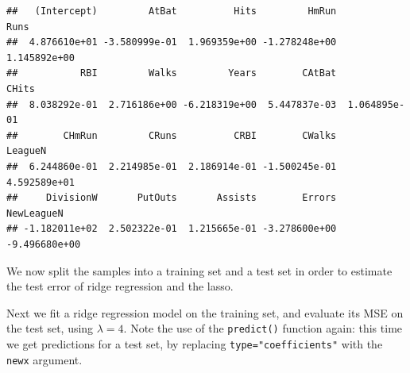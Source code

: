 \documentclass[
  openany]{book}
\newenvironment{Shaded}{\begin{snugshade}}{\end{snugshade}}
\newcommand{\DecValTok}[1]{\textcolor[rgb]{0.00,0.00,0.81}{#1}}
\newcommand{\FloatTok}[1]{\textcolor[rgb]{0.00,0.00,0.81}{#1}}
\newcommand{\KeywordTok}[1]{\textcolor[rgb]{0.13,0.29,0.53}{\textbf{#1}}}
\newcommand{\NormalTok}[1]{#1}
\newcommand{\OperatorTok}[1]{\textcolor[rgb]{0.81,0.36,0.00}{\textbf{#1}}}
\newcommand{\StringTok}[1]{\textcolor[rgb]{0.31,0.60,0.02}{#1}}
\begin{document}
\begin{verbatim}
##   (Intercept)         AtBat          Hits         HmRun          Runs 
##  4.876610e+01 -3.580999e-01  1.969359e+00 -1.278248e+00  1.145892e+00 
##           RBI         Walks         Years        CAtBat         CHits 
##  8.038292e-01  2.716186e+00 -6.218319e+00  5.447837e-03  1.064895e-01 
##        CHmRun         CRuns          CRBI        CWalks       LeagueN 
##  6.244860e-01  2.214985e-01  2.186914e-01 -1.500245e-01  4.592589e+01 
##     DivisionW       PutOuts       Assists        Errors    NewLeagueN 
## -1.182011e+02  2.502322e-01  1.215665e-01 -3.278600e+00 -9.496680e+00
\end{verbatim}

We now split the samples into a training set and a test set in order
to estimate the test error of ridge regression and the lasso.

\begin{Shaded}
\end{Shaded}

Next we fit a ridge regression model on the training set, and evaluate
its MSE on the test set, using \(\lambda = 4\). Note the use of the \texttt{predict()}
function again: this time we get predictions for a test set, by replacing
\texttt{type="coefficients"} with the \texttt{newx} argument.
\end{document}

